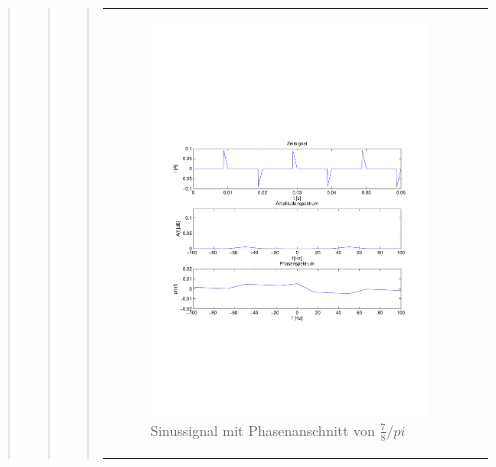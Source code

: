 \begin{quote}
\begin{quote}
\begin{quote}
\begin{center}
\begin{tabular}{ll}
\begin{minipage}{0.6\textwidth}
                    \end{minipage}
                    \begin{minipage}{0.6\textwidth}
    
                       \begin{figure}[H]
                            \label{fig:}
                            \includegraphics[scale=0.5, trim = 2cm 7cm 1.5cm 8.5cm, clip]{./Bilder/Phasenanschnitt78pi.pdf} %
                            \caption{Sinussignal mit Phasenanschnitt von $\frac{7}{8}/pi$}
                        \end{figure}
                     \vspace{-1.5em}
    
                    \end{minipage}
    

\end{tabular}
\end{center}
\end{quote}
\end{quote}
\end{quote}
